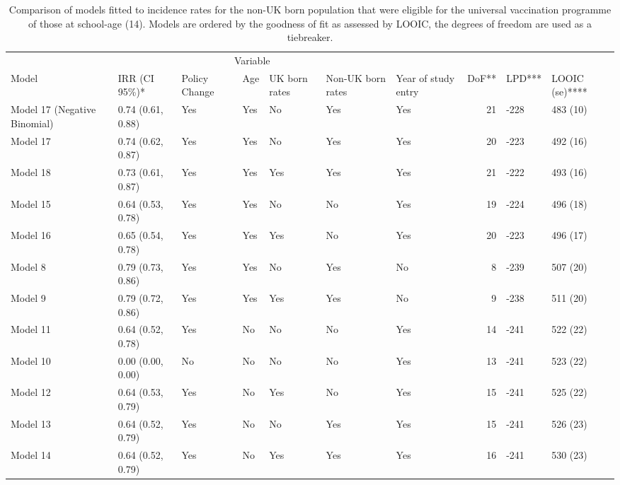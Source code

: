\documentclass[11pt,twoside]{bristolthesis}
\begin{document}
  \begin{landscape}\begin{table}[!h]
  
  \caption[Comparison of models fitted to incidence rates for the non-UK born population that were eligible for the universal vaccination programme of those at school-age (14).]{\label{tab:07-summary-universal-nonukborn}Comparison of models fitted to incidence rates for the non-UK born population that were eligible for the universal vaccination programme of those at school-age (14). Models are ordered by the goodness of fit as assessed by LOOIC, the degrees of freedom are used as a tiebreaker.}
  \centering
  \fontsize{8}{10}\selectfont
  \begin{tabular}{>{\raggedright\arraybackslash}p{3cm}llllllrll}
  \toprule
  \multicolumn{2}{c}{ } & \multicolumn{5}{c}{Variable} & \multicolumn{3}{c}{ } \\
  \cmidrule(l{3pt}r{3pt}){3-7}
  Model & IRR (CI 95\%)* & Policy Change & Age & UK born rates & Non-UK born rates & Year of study entry & DoF** & LPD*** & LOOIC (se)****\\
  \midrule
  Model 17 (Negative Binomial) & 0.74 (0.61, 0.88) & Yes & Yes & No & Yes & Yes & 21 & -228 & 483 (10)\\
  Model 17 & 0.74 (0.62, 0.87) & Yes & Yes & No & Yes & Yes & 20 & -223 & 492 (16)\\
  Model 18 & 0.73 (0.61, 0.87) & Yes & Yes & Yes & Yes & Yes & 21 & -222 & 493 (16)\\
  Model 15 & 0.64 (0.53, 0.78) & Yes & Yes & No & No & Yes & 19 & -224 & 496 (18)\\
  Model 16 & 0.65 (0.54, 0.78) & Yes & Yes & Yes & No & Yes & 20 & -223 & 496 (17)\\
  \addlinespace
  Model 8 & 0.79 (0.73, 0.86) & Yes & Yes & No & Yes & No & 8 & -239 & 507 (20)\\
  Model 9 & 0.79 (0.72, 0.86) & Yes & Yes & Yes & Yes & No & 9 & -238 & 511 (20)\\
  Model 11 & 0.64 (0.52, 0.78) & Yes & No & No & No & Yes & 14 & -241 & 522 (22)\\
  Model 10 & 0.00 (0.00, 0.00) & No & No & No & No & Yes & 13 & -241 & 523 (22)\\
  Model 12 & 0.64 (0.53, 0.79) & Yes & No & Yes & No & Yes & 15 & -241 & 525 (22)\\
  \addlinespace
  Model 13 & 0.64 (0.52, 0.79) & Yes & No & No & Yes & Yes & 15 & -241 & 526 (23)\\
  Model 14 & 0.64 (0.52, 0.79) & Yes & No & Yes & Yes & Yes & 16 & -241 & 530 (23)\\

\end{tabular}
\end{table}
\end{landscape}
\end{document}
